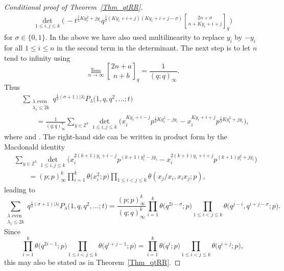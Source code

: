 \documentclass[pdftex]{sigma}
\numberwithin{equation}{section}
\renewcommand{\leq}{\leqslant}
\newcommand{\qbin}[2]{\genfrac{[}{]}{0pt}{}{#1}{#2}}
\newcommand{\abs}[1]{\vert#1\vert}
\newcommand{\la}{\lambda}
\begin{document}
\begin{proof}[{Conditional proof of Theorem~\ref{Thm_qtRR}}]
\begin{align}
{\det_{1\leq i,j\leq k}\biggl(}{}\, -
t^{\frac{1}{2}Ky_i^2+j y_i}q^{\frac{1}{2}(Ky_i+i+j)(Ky_i+i+j-\sigma)}
\qbin{2n+\sigma}{n+Ky_i+i+j}_q \biggr) \label{Eq_finite}
\end{align}
for $\sigma\in\{0,1\}$.
In the above we have also used multilinearity to replace $y_i$ by
$-y_i$ for all $1\leq i\leq n$ in the second term in the determinant.
The next step is to let $n$ tend to infinity using
\[
\lim_{n\to\infty} \qbin{2n+a}{n+b}_q=\frac{1}{(q;q)_{\infty}}.
\]
Thus
\begin{align*}
&\sum_{\substack{\la\text{ even} \\[1pt] \la_1\leq 2k}}
q^{\frac{1}{2}(\sigma+1)\abs{\la}} P_{\la}\bigl(1,q,q^2,\dots;t\bigr) \\
&\qquad{}=\frac{1}{(q;q)_{\infty}^k}
\sum_{y\in\mathbb{Z}^k} \det_{1\leq i,j\leq k}
\bigl( x_i^{Ky_i+i-j} p^{\frac{1}{2}Ky_i^2-j y_i}-
x_i^{Ky_i+i+j} p^{\frac{1}{2}Ky_i^2+j y_i} \bigr),
\end{align*}
where  and .
The right-hand side can be written in product form
by the  Macdonald identity \cite{Macdonald72}
\begin{align*}
&\sum_{y\in\mathbb{Z}^k}
\det_{1\leq i,j\leq k}\bigl(
x_i^{2(k+1)y_i+i-j} p^{(k+1)y_i^2-jy_i}
-x_i^{2(k+1)y_i+i+j} p^{(k+1)y_i^2+jy_i}\bigr) \\
&\qquad{}=(p;p)_{\infty}^k\prod_{i=1}^k \theta\bigl(x_i^2;p\bigr)
\prod_{1\leq i<j\leq k} \theta(x_j/x_i,x_ix_j;p),
\end{align*}
leading to
\[
\sum_{\substack{\la\text{ even} \\[1pt] \la_1\leq 2k}}
q^{\frac{1}{2}(\sigma+1)\abs{\la}} P_{\la}\bigl(1,q,q^2,\dots;t\bigr)
=\frac{(p;p)_{\infty}^k}{(q;q)_{\infty}^k}
\prod_{i=1}^k \theta\bigl(q^{2i-\sigma};p\bigr)
\prod_{1\leq i<j\leq k} \theta\bigl(q^{j-i},q^{i+j-\sigma};p\bigr).
\]
Since
\[
\prod_{i=1}^k \theta\bigl(q^{2i-1};p\bigr)
\prod_{1\leq i<j\leq k} \theta\bigl(q^{i+j-1};p\bigr)
=\prod_{i=1}^k \theta\bigl(q^i;p\bigr)
\prod_{1\leq i<j\leq k} \theta\bigl(q^{i+j};p\bigr),
\]
this may also be stated as in Theorem~\ref{Thm_qtRR}.
\end{proof}
\end{document}
